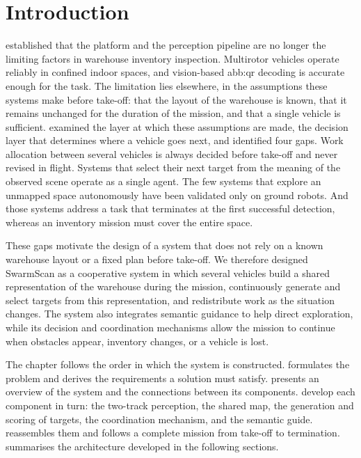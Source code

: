 \section{Introduction}%
\label{sec:sys:intro}

 established that the platform and the perception pipeline
are no longer the limiting factors in warehouse inventory inspection. Multirotor
vehicles operate reliably in confined indoor spaces, and vision-based
\gls{abb:qr} decoding is accurate enough for the task. The limitation lies
elsewhere, in the assumptions these systems make before take-off: that the layout
of the warehouse is known, that it remains unchanged for the duration of the
mission, and that a single vehicle is sufficient.  examined the
layer at which these assumptions are made, the decision layer that determines
where a vehicle goes next, and identified four gaps. Work allocation between
several vehicles is always decided before take-off and never revised in flight.
Systems that select their next target from the meaning of the observed scene
operate as a single agent. The few systems that explore an unmapped space
autonomously have been validated only on ground robots. And those systems address
a task that terminates at the first successful detection, whereas an inventory
mission must cover the entire space.

These gaps motivate the design of a system that does not rely on a known warehouse
layout or a fixed plan before take-off. We therefore designed SwarmScan as a
cooperative system in which several vehicles build a shared representation of the
warehouse during the mission, continuously generate and select targets from this
representation, and redistribute work as the situation changes. The system also
integrates semantic guidance to help direct exploration, while its decision and
coordination mechanisms allow the mission to continue when obstacles appear,
inventory changes, or a vehicle is lost.

The chapter follows the order in which the system is constructed.
 formulates the problem and derives the requirements a
solution must satisfy.  presents an overview of the system
and the connections between its components.
develop each component in turn: the two-track perception, the shared map, the
generation and scoring of targets, the coordination mechanism, and the semantic
guide.  reassembles them and follows a complete mission
from take-off to termination.  summarises the
architecture developed in the following sections.

